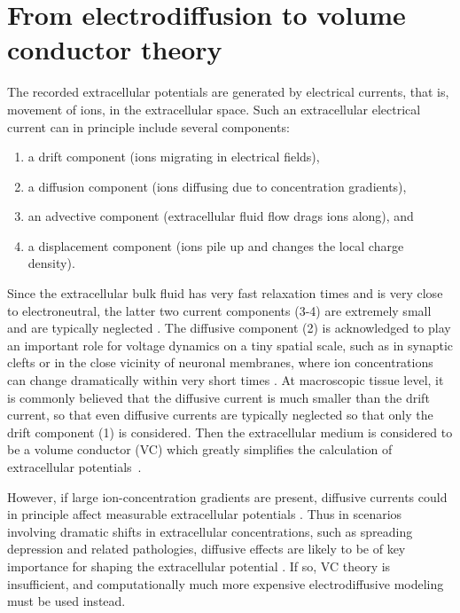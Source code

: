\documentclass[preprint,11pt,authoryear]{elsarticle}
\begin{document}
\section{%
From electrodiffusion to volume conductor theory}
\label{sec:theory}

The recorded extracellular potentials are generated by electrical currents, that is, movement of ions, in the extracellular space.
Such an extracellular electrical current can in principle include several components:
%
\begin{enumerate}
\item a drift component (ions migrating in electrical fields), 
\item a diffusion component (ions diffusing due to concentration gradients),
\item an advective component (extracellular fluid flow drags ions along), and
\item a displacement component (ions pile up and changes the local charge density). 
\end{enumerate}
%
Since the extracellular bulk fluid has very fast relaxation times and is very close to electroneutral, the latter two current components (3-4) are extremely small and are typically neglected \citep{Grodzinsky2011, Gratiy2017}. The diffusive component (2) is acknowledged to play an important role for voltage dynamics on a tiny spatial scale, such as in synaptic clefts or in the close vicinity of neuronal membranes, where ion concentrations can change dramatically within very short times \citep{Savtchenko2017, Pods2017}. At macroscopic tissue level, it is commonly believed that the diffusive current is much smaller than the drift current, so that even diffusive currents are typically neglected so that only the drift component (1) is considered. Then the extracellular medium is considered to be a volume conductor (VC) which greatly simplifies the calculation of extracellular potentials~\citep{Holt1999, Linden2014}.

However, if large ion-concentration gradients are present, diffusive currents could in principle affect measurable extracellular potentials \citep{Halnes2016, Halnes2017, Solbra2018}. Thus in scenarios involving dramatic shifts in extracellular concentrations, such as spreading depression and related pathologies, diffusive effects are likely to be of key importance for shaping the extracellular potential \citep{Almeida2004, OConnell2016}. If so, VC theory is insufficient, and computationally much more expensive electrodiffusive modeling must be used instead.
\end{document}
